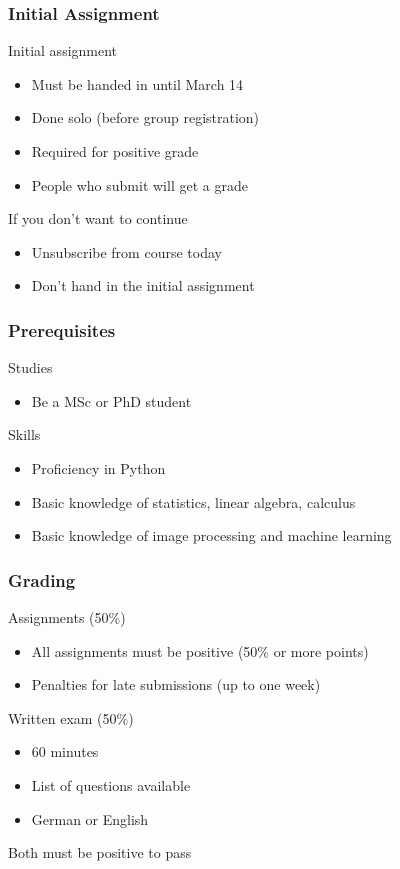 \documentclass[xetex,professionalfont]{beamer}
\renewcommand\emph[1]{\textcolor{tuwcvl_cvl_blue}{#1}}
\begin{document}
\begin{frame}
  \frametitle{Initial Assignment}
  Initial assignment
  \begin{itemize}
    \item \emph{Must be handed in until March 14}
    \item Done solo (before group registration)
    \item Required for positive grade
    \item People who submit will get a grade
  \end{itemize}

  \bigskip
  If you don't want to continue
  \begin{itemize}
    \item Unsubscribe from course today
    \item Don't hand in the initial assignment
  \end{itemize}
\end{frame}


\begin{frame}
\frametitle{Prerequisites}

Studies
\begin{itemize}
  \item Be a MSc or PhD student
\end{itemize}

\bigskip

Skills
\begin{itemize}
  \item Proficiency in Python
  \item Basic knowledge of statistics, linear algebra, calculus
  \item Basic knowledge of image processing and machine learning
\end{itemize}
\end{frame}


\begin{frame}
\frametitle{Grading}

Assignments (50\%)
\begin{itemize}
  \item All assignments must be positive (50\% or more points)
  \item Penalties for late submissions (up to one week)
\end{itemize}

\bigskip

Written exam (50\%)
\begin{itemize}
    \item 60 minutes
    \item List of questions available
    \item German or English
\end{itemize}

\bigskip

Both must be positive to pass

\end{frame}
\end{document}
